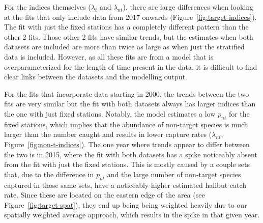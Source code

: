 \documentclass[12pt]{article}\usepackage[]{graphicx}\usepackage[]{color}
\begin{document}
For the indices themselves (\(\lambda_t\) and \(\lambda_{nt}\)), there are large differences when looking at the fits that only include data from 2017 onwards (Figure~\ref{fig:target-indices}). The fit with just the fixed stations has a completely different pattern than the other 2 fits. Those other 2 fits have similar trends, but the estimates when both datasets are included are more than twice as large as when just the stratified data is included. However, as all these fits are from a model that is overparameterized for the length of time present in the data, it is difficult to find clear links between the datasets and the modelling output.

For the fits that incorporate data starting in 2000, the trends between the two fits are very similar but the fit with both datasets always has larger indices than the one with just fixed stations. Notably, the model estimates a low \(p_{nt}\) for the fixed stations, which implies that the abundance of non-target species is much larger than the number caught and results in lower capture rates (\(\lambda_{nt}\), Figure~\ref{fig:non-t-indices}). The one year where trends appear to differ between the two is in 2015, where the fit with both datasets has a spike noticeably absent from the fit with just the fixed stations. This is mostly caused by a couple sets that, due to the difference in \(p_{nt}\) and the large number of non-target species captured in those same sets, have a noticeably higher estimated halibut catch rate. Since these are located on the eastern edge of the area (see Figure~\ref{fig:target-spat}), they end up being being weighted heavily due to our spatially weighted average approach, which results in the spike in that given year.
\end{document}
